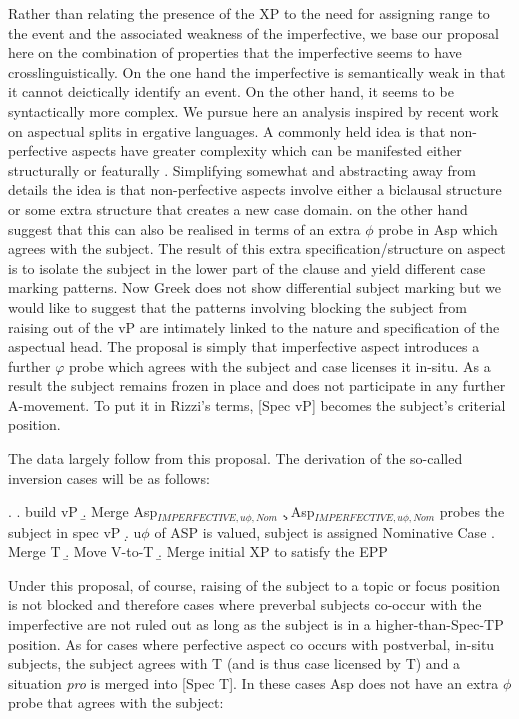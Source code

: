 \documentclass[11pt]{article}
\begin{document}
 Rather than relating the presence of the XP to the need for assigning range to the event and the associated weakness of the imperfective, we
base our proposal here on the combination of properties that the imperfective seems to have crosslinguistically.  On the one hand the imperfective is semantically weak in that it cannot deictically identify an event.  On the other hand, it seems to be syntactically more complex.  We
pursue here an analysis inspired by recent work on aspectual splits in ergative languages.  
A commonly held idea is that non-perfective aspects have greater complexity which can be manifested  either structurally \citep{coon:13, coon-preminger:15, laka:06} or featurally \citep{kalin-vanurk:12}. Simplifying somewhat and abstracting away from details the idea is that non-perfective aspects involve either a biclausal structure or some extra structure that creates a new case domain.  \citet{kalin-vanurk:12} on the other hand suggest that this can also be realised in terms of an extra $\phi$ probe in Asp which agrees with the subject.  The result of this extra specification/structure on aspect is to isolate the subject in the lower part of the clause and yield different case marking patterns.  Now Greek does not show differential subject marking but we would like to suggest that the patterns involving blocking the subject from raising out of the vP are intimately linked to the nature and specification of the aspectual head.  The proposal is simply that imperfective aspect  introduces a further $\varphi$ probe which agrees with the subject and case licenses it in-situ.  As a result the subject remains frozen in place and does not participate in any further A-movement.  To put it in Rizzi's terms, [Spec vP] becomes the subject's criterial position.  

The data largely follow from this proposal.  The derivation of the so-called inversion cases will be as follows:

\ex.
\a. build vP
\b. Merge Asp$_{IMPERFECTIVE, u\phi, Nom}$
\c. Asp$_{IMPERFECTIVE, u\phi, Nom}$ probes the subject in spec vP
\d. u$\phi$ of ASP is valued, subject is assigned Nominative Case
\e. Merge T
\b. Move V-to-T
\b. Merge initial XP to satisfy the EPP


Under this proposal, of course, raising of the subject to a topic or focus position is not blocked and therefore cases where preverbal subjects co-occur with the imperfective are not ruled out as long as the subject is in a higher-than-Spec-TP position.  As for cases where perfective aspect co occurs with postverbal, in-situ subjects, the subject agrees with T (and is thus case licensed by T) and a situation \textit{pro} is merged into [Spec T]. In these cases Asp does not have an extra $\phi$ probe that agrees with the subject:
\end{document}
